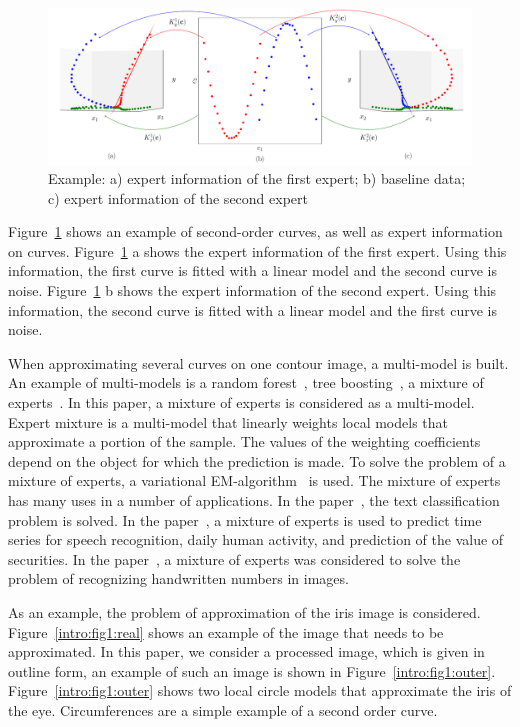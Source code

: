 \begin{figure}[h!]
     \includegraphics[width=\textwidth]{figures/explanation}
     \caption {Example: a) expert information of the first expert; b) baseline data; c) expert information of the second expert}
    \label{intro:fig2}
\end{figure}

Figure~\ref{intro:fig2} shows an example of second-order curves, as well as expert information on curves. Figure~\ref{intro:fig2} a shows the expert information of the first expert. Using this information, the first curve is fitted with a linear model and the second curve is noise. Figure~\ref{intro:fig2} b shows the expert information of the second expert. Using this information, the second curve is fitted with a linear model and the first curve is noise.

When approximating several curves on one contour image, a multi-model is built. An example of multi-models is a random forest~\cite{Ishwaran2012}, tree boosting~\cite{Tianqi2016}, a mixture of experts~\cite{Yuksel2012}. In this paper, a mixture of experts is considered as a multi-model. Expert mixture is a multi-model that linearly weights local models that approximate a portion of the sample. The values of the weighting coefficients depend on the object for which the prediction is made. To solve the problem of a mixture of experts, a variational EM-algorithm~\cite{Dempster1977, bishop2006, Peng1996} is used. The mixture of experts has many uses in a number of applications. In the paper~\cite{Estabrooks2001}, the text classification problem is solved. In the paper~\cite{Cheung1995, Weigend2000, Cao2003, Mossavat2010, Sminchisescu2007, Tuerk2001, Yumlu2003}, a mixture of experts is used to predict time series for speech recognition, daily human activity, and prediction of the value of securities. In the paper~\cite{Ebrahimpour2009}, a mixture of experts was considered to solve the problem of recognizing handwritten numbers in images.

As an example, the problem of approximation of the iris image is considered. Figure~\ref{intro:fig1:real} shows an example of the image that needs to be approximated. In this paper, we consider a processed image, which is given in outline form, an example of such an image is shown in Figure~\ref{intro:fig1:outer}. Figure~\ref{intro:fig1:outer} shows two local circle models that approximate the iris of the eye. Circumferences are a simple example of a second order curve.

